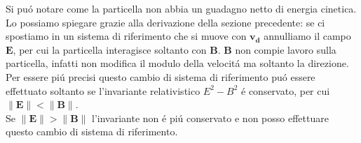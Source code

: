\documentclass[11pt]{article}
\begin{document}
Si puó notare come la particella non abbia un guadagno netto di energia cinetica. Lo possiamo spiegare grazie alla derivazione della sezione precedente: se ci spostiamo in un sistema di riferimento che si muove con $\mathbf{v_d}$ annulliamo il campo $\mathbf{E}$, per cui la particella interagisce soltanto con $\mathbf{B}$. $\mathbf{B}$ non compie lavoro sulla particella, infatti non modifica il modulo della velocitá ma soltanto la direzione. \\
Per essere piú precisi questo cambio di sistema di riferimento puó essere effettuato soltanto se l'invariante relativistico $E^2 - B^2 $ é conservato, per cui $ \|\mathbf{E}\| < \|\mathbf{B}\|$. \\
Se $ \|\mathbf{E}\| > \|\mathbf{B}\|$ l'invariante non é piú conservato e non posso effettuare questo cambio di sistema di riferimento.
\end{document}

